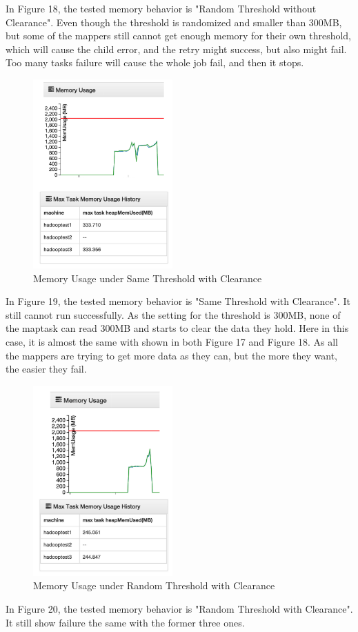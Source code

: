 In Figure 18, the tested memory behavior is "Random Threshold without Clearance". Even though the threshold is randomized and smaller than 300MB, but some of the mappers still cannot get enough memory for their own threshold, which will cause the child error, and the retry might success, but also might fail. Too many tasks failure will cause the whole job fail, and then it stops.

\begin{figure}[ht]
  \centering
    \includegraphics[width=2.1in]{image/test3c.png}
    \caption{Memory Usage under Same Threshold with Clearance}
    \label{ref:test3c}
\end{figure}

In Figure 19, the tested memory behavior is "Same Threshold with Clearance". It still cannot run successfully. As the setting for the threshold is 300MB, none of the maptask can read 300MB and starts to clear the data they hold. Here in this case, it is almost the same with shown in both Figure 17 and Figure 18. As all the mappers are trying to get more data as they can, but the more they want, the easier they fail.

\begin{figure}[ht]
  \centering
    \includegraphics[width=2.1in]{image/test3d.png}
    \caption{Memory Usage under Random Threshold with Clearance}
    \label{ref:test3d}
\end{figure}

In Figure 20, the tested memory behavior is "Random Threshold with Clearance". It still show failure the same with the former three ones. 